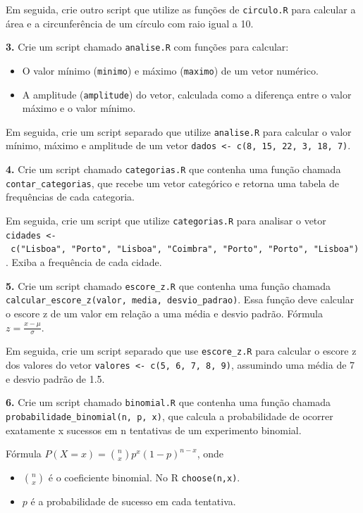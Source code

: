 \documentclass[
]{book}
\providecommand{\tightlist}{%
  \setlength{\itemsep}{0pt}\setlength{\parskip}{0pt}}
\begin{document}
Em seguida, crie outro script que utilize as funções de \texttt{circulo.R} para calcular a área e a circunferência de um círculo com raio igual a 10.

\textbf{3.} Crie um script chamado \texttt{analise.R} com funções para calcular:

\begin{itemize}
\tightlist
\item
  O valor mínimo (\texttt{minimo}) e máximo (\texttt{maximo}) de um vetor numérico.
\item
  A amplitude (\texttt{amplitude}) do vetor, calculada como a diferença entre o valor máximo e o valor mínimo.
\end{itemize}

Em seguida, crie um script separado que utilize \texttt{analise.R} para calcular o valor mínimo, máximo e amplitude de um vetor \texttt{dados\ \textless{}-\ c(8,\ 15,\ 22,\ 3,\ 18,\ 7)}.

\textbf{4.} Crie um script chamado \texttt{categorias.R} que contenha uma função chamada \texttt{contar\_categorias}, que recebe um vetor categórico e retorna uma tabela de frequências de cada categoria.

Em seguida, crie um script que utilize \texttt{categorias.R} para analisar o vetor \texttt{cidades\ \textless{}-\ c("Lisboa",\ "Porto",\ "Lisboa",\ "Coimbra",\ "Porto",\ "Porto",\ "Lisboa")}. Exiba a frequência de cada cidade.

\textbf{5.} Crie um script chamado \texttt{escore\_z.R} que contenha uma função chamada \texttt{calcular\_escore\_z(valor,\ media,\ desvio\_padrao)}. Essa função deve calcular o escore z de um valor em relação a uma média e desvio padrão. Fórmula \(z = \frac{x-\mu}{\sigma}\).

Em seguida, crie um script separado que use \texttt{escore\_z.R} para calcular o escore z dos valores do vetor \texttt{valores\ \textless{}-\ c(5,\ 6,\ 7,\ 8,\ 9)}, assumindo uma média de 7 e desvio padrão de 1.5.

\textbf{6.} Crie um script chamado \texttt{binomial.R} que contenha uma função chamada \texttt{probabilidade\_binomial(n,\ p,\ x)}, que calcula a probabilidade de ocorrer exatamente x sucessos em n tentativas de um experimento binomial.

Fórmula \(P(X=x) = \binom{n}{x}p^x(1-p)^{n-x}\), onde

\begin{itemize}
\tightlist
\item
  \(\binom{n}{x}\) é o coeficiente binomial. No R \texttt{choose(n,x)}.
\item
  \(p\) é a probabilidade de sucesso em cada tentativa.
\end{itemize}
\end{document}
